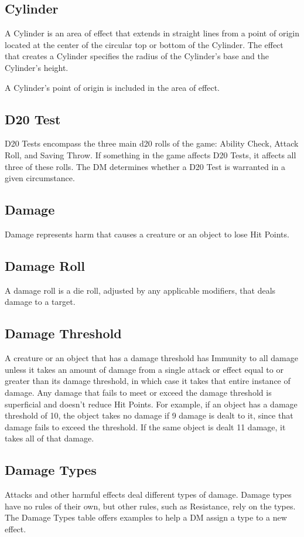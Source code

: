 \documentclass[10pt,a4paper,twoside,bg=print,twocolumn,openany,nodeprecatedcode]{dndarticle}
\begin{document}
\subsection{Cylinder}
A Cylinder is an area of effect that extends in straight lines from a point of origin located at the center of the circular top or bottom of the Cylinder. The effect that creates a Cylinder specifies the radius of the Cylinder's base and the Cylinder's height.

A Cylinder's point of origin is included in the area of effect.

\subsection{D20 Test}
D20 Tests encompass the three main d20 rolls of the game: Ability Check, Attack Roll, and Saving Throw. If something in the game affects D20 Tests, it affects all three of these rolls. The DM determines whether a D20 Test is warranted in a given circumstance.

\subsection{Damage}
Damage represents harm that causes a creature or an object to lose Hit Points.

\subsection{Damage Roll}
A damage roll is a die roll, adjusted by any applicable modifiers, that deals damage to a target.

\subsection{Damage Threshold}
A creature or an object that has a damage threshold has Immunity to all damage unless it takes an amount of damage from a single attack or effect equal to or greater than its damage threshold, in which case it takes that entire instance of damage. Any damage that fails to meet or exceed the damage threshold is superficial and doesn't reduce Hit Points. For example, if an object has a damage threshold of 10, the object takes no damage if 9 damage is dealt to it, since that damage fails to exceed the threshold. If the same object is dealt 11 damage, it takes all of that damage.

\subsection{Damage Types}
Attacks and other harmful effects deal different types of damage. Damage types have no rules of their own, but other rules, such as Resistance, rely on the types. The Damage Types table offers examples to help a DM assign a type to a new effect.
\end{document}
